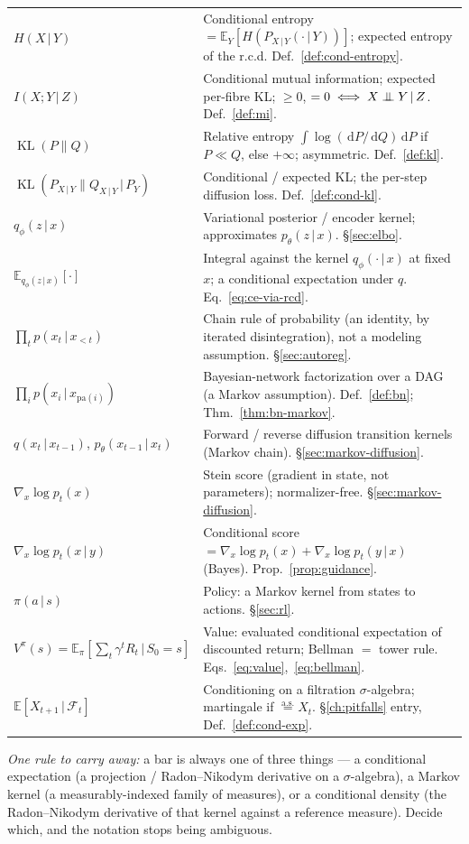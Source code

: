 \documentclass[11pt,oneside]{report}
\theoremstyle{plain}
\theoremstyle{definition}
\theoremstyle{remark}
\newcommand{\E}{\mathbb{E}}
\newcommand{\dd}{\,\mathrm{d}}
\newcommand{\Fcal}{\mathcal{F}}
\newcommand{\eqas}{\overset{\text{a.s.}}{=}}
\newcommand{\given}{\,\vert\,}
\newcommand{\indep}{\mathrel{\perp\mkern-10mu\perp}}
\DeclareMathOperator{\KL}{KL}
\numberwithin{equation}{chapter}
\begin{document}
\begin{longtable}{@{} p{} p{} @{}}
$H(X\given Y)$ &
  Conditional entropy $=\E_Y[H(P_{X\given Y}(\cdot\given Y))]$; expected
  entropy of the r.c.d. Def.~\ref{def:cond-entropy}.\\
$I(X;Y\given Z)$ &
  Conditional mutual information; expected per-fibre KL; $\ge0$, $=0\iff
  X\indep Y\given Z$. Def.~\ref{def:mi}.\\
$\KL(P\|Q)$ &
  Relative entropy $\int\log(\dd P/\dd Q)\dd P$ if $P\ll Q$, else $+\infty$;
  asymmetric. Def.~\ref{def:kl}.\\
$\KL(P_{X\given Y}\|Q_{X\given Y}\,|\,P_Y)$ &
  Conditional / expected KL; the per-step diffusion loss.
  Def.~\ref{def:cond-kl}.\\
$q_\phi(z\given x)$ &
  Variational posterior / encoder kernel; approximates $p_\theta(z\given x)$.
  \S\ref{sec:elbo}.\\
$\E_{q_\phi(z\given x)}[\cdot]$ &
  Integral against the kernel $q_\phi(\cdot\given x)$ at fixed $x$; a
  conditional expectation under $q$. Eq.~\eqref{eq:ce-via-rcd}.\\
$\prod_t p(x_t\given x_{<t})$ &
  Chain rule of probability (an identity, by iterated disintegration), not a
  modeling assumption. \S\ref{sec:autoreg}.\\
$\prod_i p(x_i\given x_{\mathrm{pa}(i)})$ &
  Bayesian-network factorization over a DAG (a Markov assumption).
  Def.~\ref{def:bn}; Thm.~\ref{thm:bn-markov}.\\
$q(x_t\given x_{t-1})$, $p_\theta(x_{t-1}\given x_t)$ &
  Forward / reverse diffusion transition kernels (Markov chain).
  \S\ref{sec:markov-diffusion}.\\
$\nabla_x\log p_t(x)$ &
  Stein score (gradient in state, not parameters); normalizer-free.
  \S\ref{sec:markov-diffusion}.\\
$\nabla_x\log p_t(x\given y)$ &
  Conditional score $=\nabla_x\log p_t(x)+\nabla_x\log p_t(y\given x)$
  (Bayes). Prop.~\ref{prop:guidance}.\\
$\pi(a\given s)$ &
  Policy: a Markov kernel from states to actions. \S\ref{sec:rl}.\\
$V^\pi(s)=\E_\pi[\sum_t\gamma^t R_t\given S_0=s]$ &
  Value: evaluated conditional expectation of discounted return; Bellman $=$
  tower rule. Eqs.~\eqref{eq:value},~\eqref{eq:bellman}.\\
$\E[X_{t+1}\given\Fcal_t]$ &
  Conditioning on a filtration $\sigma$-algebra; martingale if $\eqas X_t$.
  \S\ref{ch:pitfalls} entry, Def.~\ref{def:cond-exp}.\\
\end{longtable}

\vspace{0.5em}
\noindent\emph{One rule to carry away:} a bar is always one of three things
--- a conditional expectation (a projection / Radon--Nikodym derivative on
a $\sigma$-algebra), a Markov kernel (a measurably-indexed family of
measures), or a conditional density (the Radon--Nikodym derivative of that
kernel against a reference measure). Decide which, and the notation stops
being ambiguous.
\end{document}
